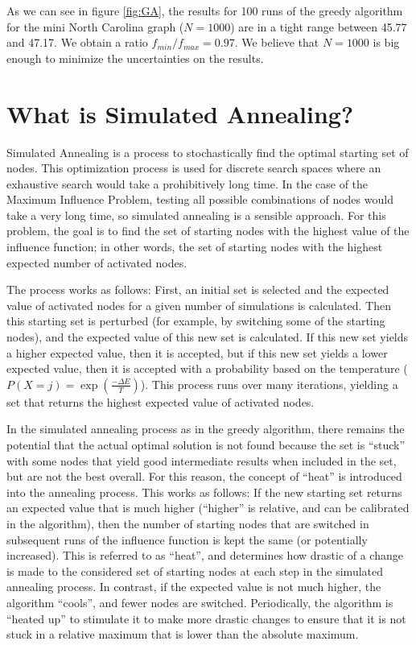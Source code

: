 \documentclass[11pt]{scrartcl} %
\begin{document}
As we can see in figure \ref{fig:GA}, the results for 100 runs of the greedy algorithm for the mini North Carolina graph ($N=1000$) are in a tight range between 45.77 and 47.17. We obtain a ratio $f_{min}/f_{max} = 0.97$. We believe that $N=1000$ is big enough to minimize the uncertainties on the results. 

\section{What is Simulated Annealing?}

Simulated Annealing is a process to stochastically find the optimal starting set of nodes.  This optimization process is used for discrete search spaces where an exhaustive search would take a prohibitively long time.  In the case of the Maximum Influence Problem, testing all possible combinations of nodes would take a very long time, so simulated annealing is a sensible approach.  For this problem, the goal is to find the set of starting nodes with the highest value of the influence function; in other words, the set of starting nodes with the highest expected number of activated nodes.  

The process works as follows: First, an initial set is selected and the expected value of activated nodes for a given number of simulations is calculated.  Then this starting set is perturbed (for example, by switching some of the starting nodes), and the expected value of this new set is calculated.  If this new set yields a higher expected value, then it is accepted, but if this new set yields a lower expected value, then it is accepted with a probability based on the temperature ($P(X=j)=\exp({\frac{-\Delta E}{T}})$).  This process runs over many iterations, yielding a set that returns the highest expected value of activated nodes.  

In the simulated annealing process as in the greedy algorithm, there remains the potential that the actual optimal solution is not found because the set is “stuck” with some nodes that yield good intermediate results when included in the set, but are not the best overall.  For this reason, the concept of “heat” is introduced into the annealing process.  This works as follows:  
If the new starting set returns an expected value that is much higher (“higher” is relative, and can be calibrated in the algorithm), then the number of starting nodes that are switched in subsequent runs of the influence function is kept the same (or potentially increased).  This is referred to as “heat”, and determines how drastic of a change is made to the considered set of starting nodes at each step in the simulated annealing process. In contrast, if the expected value is not much higher, the algorithm “cools”, and fewer nodes are switched.  Periodically, the algorithm is “heated up” to stimulate it to make more drastic changes to ensure that it is not stuck in a relative maximum that is lower than the absolute maximum.  
\end{document}
